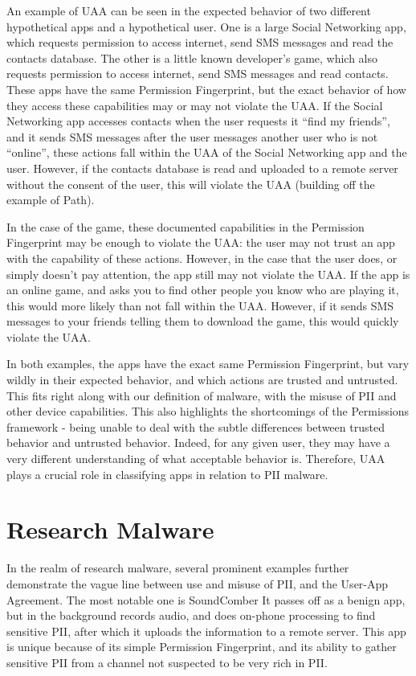 An example of UAA can be seen in the expected behavior of two different hypothetical apps and a hypothetical user. One is a large Social Networking app, which requests permission to access internet, send SMS messages and read the contacts database. The other is a little known developer's game, which also requests permission to access internet, send SMS messages and read contacts. These apps have the same Permission Fingerprint, but the exact behavior of how they access these capabilities may or may not violate the UAA. If the Social Networking app accesses contacts when the user requests it ``find my friends'', and it sends SMS messages after the user messages another user who is not ``online'', these actions fall within the UAA of the Social Networking app and the user. However, if the contacts database is read and uploaded to a remote server without the consent of the user, this will violate the UAA (building off the example of Path). 

In the case of the game, these documented capabilities in the Permission Fingerprint may be enough to violate the UAA: the user may not trust an app with the capability of these actions. However, in the case that the user does, or simply doesn't pay attention, the app still may not violate the UAA. If the app is an online game, and asks you to find other people you know who are playing it, this would more likely than not fall within the UAA. However, if it sends SMS messages to your friends telling them to download the game, this would quickly violate the UAA.

In both examples, the apps have the exact same Permission Fingerprint, but vary wildly in their expected behavior, and which actions are trusted and untrusted. This fits right along with our definition of malware, with the misuse of PII and other device capabilities. This also highlights the shortcomings of the Permissions framework - being unable to deal with the subtle differences between trusted behavior and untrusted behavior. Indeed, for any given user, they may have a very different understanding of what acceptable behavior is. Therefore, UAA plays a crucial role in classifying apps in relation to PII malware.

\section{Research Malware}
In the realm of research malware, several prominent examples further demonstrate the vague line between use and misuse of PII, and the User-App Agreement. The most notable one is SoundComber\citep{schlegel2011soundcomber} It passes off as a benign app, but in the background records audio, and does on-phone processing to find sensitive PII, after which it uploads the information to a remote server. This app is unique because of its simple Permission Fingerprint, and its ability to gather sensitive PII from a channel not suspected to be very rich in PII.

